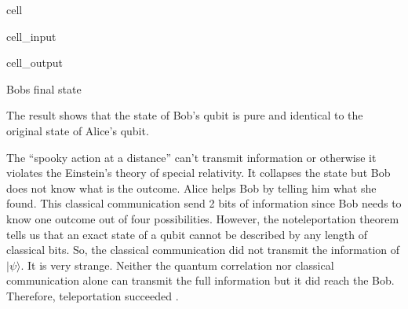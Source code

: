 \documentclass[letterpaper,10pt,english]{jupyterBook}
\begin{document}
\begin{sphinxuseclass}{cell}\begin{sphinxVerbatimInput}

\begin{sphinxuseclass}{cell_input}
\begin{sphinxVerbatim}[commandchars=\\\{\}]
   \PYG{p}{[}\PYG{p}{]}
\end{sphinxVerbatim}

\end{sphinxuseclass}\end{sphinxVerbatimInput}
\begin{sphinxVerbatimOutput}

\begin{sphinxuseclass}{cell_output}
\begin{sphinxVerbatim}[commandchars=\\\{\}]
Bob\PYGZsq{}s final state
\end{sphinxVerbatim}

\noindent{}

\end{sphinxuseclass}\end{sphinxVerbatimOutput}

\end{sphinxuseclass}
\sphinxAtStartPar
The result shows that the state of Bob’s qubit is pure and identical to the original state of Alice’s qubit.

\sphinxAtStartPar
The “spooky action at a distance” can’t transmit information or otherwise it violates the Einstein’s theory of special relativity.  It collapses the state but Bob does not know what is the outcome.  Alice helps Bob by telling him what she found.  This classical communication send 2 bits of information since Bob needs to know one outcome out of four possibilities.  However, the no\sphinxhyphen{}teleportation theorem tells us that an exact state of a qubit cannot be described by any length of classical bits.  So, the classical communication did not transmit the information of \(|\psi\rangle\).  It is very strange.  Neither the quantum correlation nor classical communication alone can transmit the full information but it did reach the Bob. Therefore, teleportation succeeded .
\end{document}
